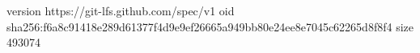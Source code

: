 version https://git-lfs.github.com/spec/v1
oid sha256:f6a8c91418e289d61377f4d9e9ef26665a949bb80e24ee8e7045c62265d8f8f4
size 493074
